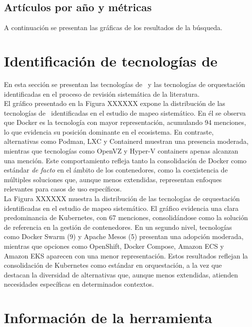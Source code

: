 \subsection{Artículos por año y métricas}
\noindent
A continuación se presentan las gráficas de los resultados de la búsqueda.


\section{Identificación de tecnologías de \VBC}\label{sec:tecnologias-vbc-identificadas}
\noindent
En esta sección se presentan las tecnologías de \VBC\ y las tecnologías de orquestación identificadas en el proceso de revisión sistemática de la literatura. \\
\noindent
El gráfico presentado en la Figura XXXXXX expone la distribución de las tecnologías de \VBC\ identificadas en el estudio de mapeo sistemático. En él se observa que Docker es la tecnología con mayor representación, acumulando 94 menciones, lo que evidencia su posición dominante en el ecosistema. En contraste, alternativas como Podman, LXC y Containerd muestran una presencia moderada, mientras que tecnologías como OpenVZ y Hyper-V containers apenas alcanzan una mención. Este comportamiento refleja tanto la consolidación de Docker como estándar \textit{de facto} en el ámbito de los contenedores, como la coexistencia de múltiples soluciones que, aunque menos extendidas, representan enfoques relevantes para casos de uso específicos. \\

\noindent
La Figura XXXXXX muestra la distribución de las tecnologías de orquestación identificadas en el estudio de mapeo sistemático. El gráfico evidencia una clara predominancia de Kubernetes, con 67 menciones, consolidándose como la solución de referencia en la gestión de contenedores. En un segundo nivel, tecnologías como Docker Swarm (9) y Apache Mesos (5) presentan una adopción moderada, mientras que opciones como OpenShift, Docker Compose, Amazon ECS y Amazon EKS aparecen con una menor representación. Estos resultados reflejan la consolidación de Kubernetes como estándar en orquestación, a la vez que destacan la diversidad de alternativas que, aunque menos extendidas, atienden necesidades específicas en determinados contextos.


\section{Información de la herramienta}

